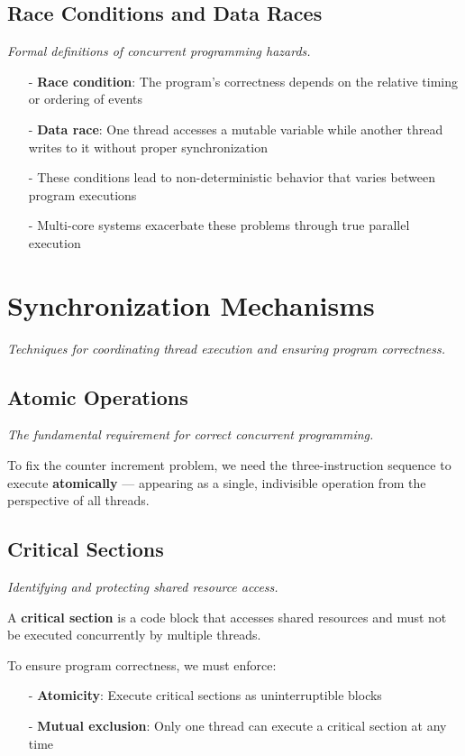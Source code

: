 \documentclass[../../compsys.tex]{subfiles}
\begin{document}
\subsection{Race Conditions and Data Races}
\textit{Formal definitions of concurrent programming hazards.}

\begin{itemize}
  \item[-] \textbf{Race condition}: The program's correctness depends on the relative timing or ordering of events
  \item[-] \textbf{Data race}: One thread accesses a mutable variable while another thread writes to it without proper synchronization
  \item[-] These conditions lead to non-deterministic behavior that varies between program executions
  \item[-] Multi-core systems exacerbate these problems through true parallel execution
\end{itemize}
\newpage
\section{Synchronization Mechanisms}
\textit{Techniques for coordinating thread execution and ensuring program correctness.}

\subsection{Atomic Operations}
\textit{The fundamental requirement for correct concurrent programming.}

To fix the counter increment problem, we need the three-instruction sequence to execute \textbf{atomically} — appearing as a single, indivisible operation from the perspective of all threads.

\subsection{Critical Sections}
\textit{Identifying and protecting shared resource access.}

A \textbf{critical section} is a code block that accesses shared resources and must not be executed concurrently by multiple threads.

To ensure program correctness, we must enforce:
\begin{itemize}
  \item[-] \textbf{Atomicity}: Execute critical sections as uninterruptible blocks
  \item[-] \textbf{Mutual exclusion}: Only one thread can execute a critical section at any time
\end{itemize}
\end{document}
